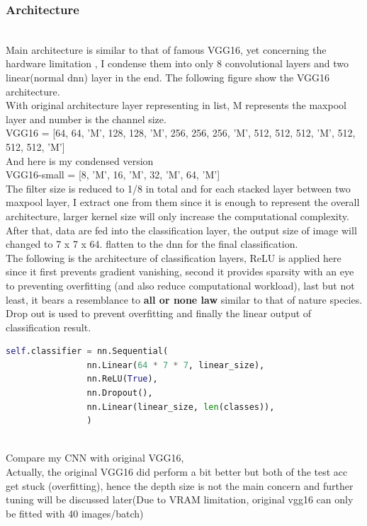\documentclass[11pt, a4paper]{article} %
\begin{document}
\subsubsection{Architecture}
\\ Main architecture is similar to that of famous VGG16, yet concerning the hardware limitation , I condense them into only 8 convolutional layers and two linear(normal dnn) layer in the end.   The following figure show the VGG16 architecture.
\\ \small{With original architecture layer representing in list, M represents the maxpool layer and number is the channel size.}
\\ VGG16 = [64, 64, 'M', 128, 128, 'M', 256, 256, 256, 'M', 512, 512, 512, 'M', 512, 512, 512, 'M']
\\ And here is my condensed version
\\ VGG16-small = [8, 'M', 16, 'M', 32, 'M', 64, 'M']
\\ The filter size is reduced to 1/8 in total and for each stacked layer between two maxpool layer, I extract one from them since it is enough to represent the overall architecture, larger kernel size will only increase the computational complexity. 
\\ After that, data are fed into the classification layer, the output size of image will changed to 7 x 7 x 64. flatten to the dnn for the final classification.
\\ The following is the architecture of classification layers, ReLU is applied here since it first prevents gradient vanishing, second it provides sparsity with an eye to preventing overfitting (and also reduce computational workload), last but not least, it bears a resemblance to \textbf{all or none law} similar to that of nature species. Drop out is used to prevent overfitting and finally the linear output of classification result.
\begin{lstlisting}[language = python]
self.classifier = nn.Sequential(
                nn.Linear(64 * 7 * 7, linear_size),
                nn.ReLU(True),
                nn.Dropout(),
                nn.Linear(linear_size, len(classes)),
                )
\end{lstlisting}
\\ Compare my CNN with original VGG16,   
\\ Actually, the original VGG16 did perform a bit better but both of the test acc get stuck (overfitting), hence the depth size is not the main concern and further tuning will be discussed later(Due to VRAM limitation, original vgg16 can only be fitted with 40 images/batch)
\end{document}
